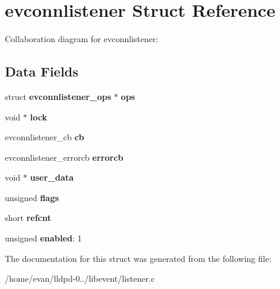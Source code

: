 \section{evconnlistener \-Struct \-Reference}
\label{structevconnlistener}


\-Collaboration diagram for evconnlistener\-:
\subsection*{\-Data \-Fields}
\begin{DoxyCompactItemize}
\item 
struct {\bf evconnlistener\-\_\-ops} $\ast$ {\bfseries ops}\label{structevconnlistener_acbdd5b67b7aae1503dac418e8172f888}

\item 
void $\ast$ {\bfseries lock}\label{structevconnlistener_a100fdaedb8eb0d56fd262e7ea2930930}

\item 
evconnlistener\-\_\-cb {\bfseries cb}\label{structevconnlistener_aede63daf19a1149e6cf776d0c0f8cbb2}

\item 
evconnlistener\-\_\-errorcb {\bfseries errorcb}\label{structevconnlistener_afd4f90bc4c1953fe007cfc57b8690670}

\item 
void $\ast$ {\bfseries user\-\_\-data}\label{structevconnlistener_a0f53d287ac7c064d1a49d4bd93ca1cb9}

\item 
unsigned {\bfseries flags}\label{structevconnlistener_a8b08a4d2ec878257d64c55f64a62242c}

\item 
short {\bfseries refcnt}\label{structevconnlistener_af72eeaa05bf2c75b8d2cbcf396ccd0c4}

\item 
unsigned {\bfseries enabled}\-: 1\label{structevconnlistener_a50101089d91b712b53825d25ab0a5a2a}

\end{DoxyCompactItemize}


\-The documentation for this struct was generated from the following file\-:\begin{DoxyCompactItemize}
\item 
/home/evan/lldpd-\/0../libevent/listener.\-c\end{DoxyCompactItemize}
